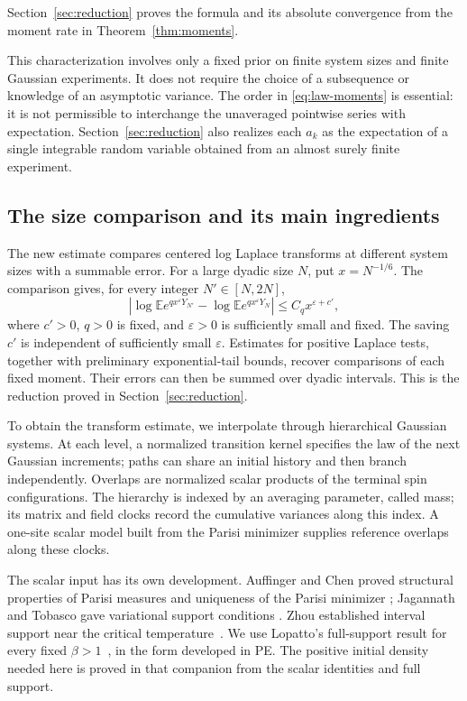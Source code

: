 Section~\ref{sec:reduction} proves the formula and its absolute convergence from the moment rate in Theorem~\ref{thm:moments}.

This characterization involves only a fixed prior on finite system sizes and finite Gaussian experiments. It does not require the choice of a subsequence or knowledge of an asymptotic variance. The order in \eqref{eq:law-moments} is essential: it is not permissible to interchange the unaveraged pointwise series with expectation. Section~\ref{sec:reduction} also realizes each $a_k$ as the expectation of a single integrable random variable obtained from an almost surely finite experiment.

\subsection{The size comparison and its main ingredients}

The new estimate compares centered log Laplace transforms at different
system sizes with a summable error. For a large dyadic size $N$, put
$x=N^{-1/6}$. The comparison gives, for every integer $N'\in[N,2N]$,
\[
 \left|\log\mathbb E e^{q x^\varepsilon Y_{N'}}
       -\log\mathbb E e^{q x^\varepsilon Y_N}\right|
 \le C_q x^{\varepsilon+c'},
\]
where $c'>0$, $q>0$ is fixed, and $\varepsilon>0$ is sufficiently
small and fixed. The saving $c'$ is independent of sufficiently small
$\varepsilon$. Estimates for positive Laplace tests, together with
preliminary exponential-tail bounds, recover comparisons of each fixed
moment. Their errors can then be summed over dyadic intervals. This is the reduction
proved in Section~\ref{sec:reduction}.

To obtain the transform estimate, we interpolate through hierarchical
Gaussian systems. At each level, a normalized transition kernel
specifies the law of the next Gaussian increments; paths can share an
initial history and then branch independently. Overlaps are normalized
scalar products of the terminal spin configurations. The hierarchy is
indexed by an averaging parameter, called mass; its matrix and field
clocks record the cumulative variances along this index. A one-site
scalar model built from the Parisi minimizer supplies reference overlaps
along these clocks.

The scalar input has its own development. Auffinger and Chen proved
structural properties of Parisi measures and uniqueness of the Parisi minimizer
\cite{AuffingerChenProperties2015,AuffingerChenUniqueness2015};
Jagannath and Tobasco gave variational support conditions
\cite{JagannathTobasco2017}. Zhou established interval support near the
critical temperature~\cite{Zhou2025}. We use Lopatto's full-support
result for every fixed $\beta>1$~\cite[Theorem~1.1 and Lemma~2.2]{Lopatto2026},
in the form developed in PE. The positive initial density needed here
is proved in that companion from the scalar identities and full
support.


